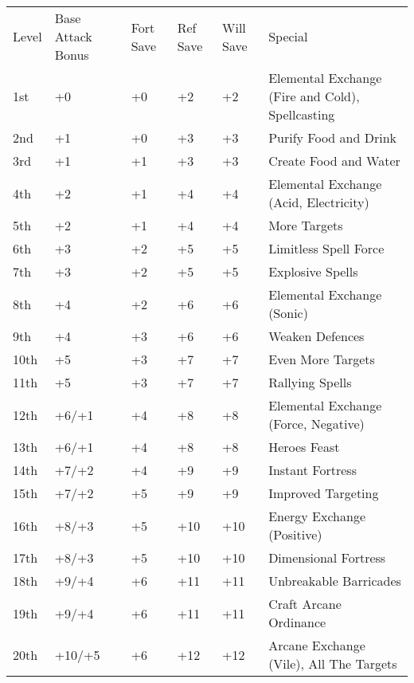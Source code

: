 \begin{table}[htb]
\begin{small}
\begin{tabular}{lp{3cm}p{0.7cm}p{0.7cm}p{0.7cm}l}
Level  &Base Attack Bonus &Fort Save &Ref Save &Will Save &Special\\
1st &+0 &+0 &+2 &+2 &Elemental Exchange (Fire and Cold), Spellcasting\\
2nd &+1 &+0 &+3 &+3 &Purify Food and Drink\\
3rd &+1 &+1 &+3 &+3 &Create Food and Water\\
4th &+2 &+1 &+4 &+4 &Elemental Exchange (Acid, Electricity)\\
5th &+2 &+1 &+4 &+4 &More Targets\\
6th &+3 &+2 &+5 &+5 &Limitless Spell Force\\
7th &+3 &+2 &+5 &+5 &Explosive Spells\\
8th &+4 &+2 &+6 &+6 &Elemental Exchange (Sonic)\\
9th &+4 &+3 &+6 &+6 &Weaken Defences\\
10th &+5 &+3 &+7 &+7 &Even More Targets\\
11th &+5 &+3 &+7 &+7 &Rallying Spells\\
12th &+6/+1 &+4 &+8 &+8 &Elemental Exchange (Force, Negative)\\
13th &+6/+1 &+4 &+8 &+8 &Heroes Feast\\
14th &+7/+2 &+4 &+9 &+9 &Instant Fortress\\
15th &+7/+2 &+5 &+9 &+9 &Improved Targeting\\
16th &+8/+3 &+5 &+10 &+10 &Energy Exchange (Positive)\\
17th &+8/+3 &+5 &+10 &+10 &Dimensional Fortress\\
18th &+9/+4 &+6 &+11 &+11 &Unbreakable Barricades\\
19th &+9/+4 &+6 &+11 &+11 &Craft Arcane Ordinance\\
20th &+10/+5 &+6 &+12 &+12 &Arcane Exchange (Vile), All The Targets\\
\end{tabular}
\end{small}
\end{table}


